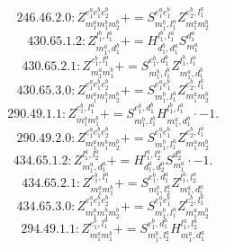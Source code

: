 \documentclass[letterpaper,10pt,fleqn,leqno,onecolumn]{article}
\begin{document}
\begin{equation} \;\;\;\;\;\;  246.46.2.0: Z^{e_{1}^{a}e_{1}^{b}e_{2}^{b}}_{m_{1}^{a}m_{1}^{b}m_{2}^{b}}+=S^{e_{1}^{a}e_{1}^{b}}_{m_{1}^{b},l_{1}^{a}}Z^{e_{2}^{b},l_{1}^{a}}_{m_{1}^{a}m_{2}^{b}} \end{equation}
\begin{equation} \;\;\;\;\;\;  430.65.1.2: Z^{l_{1}^{b},l_{1}^{a}}_{m_{1}^{a},d_{1}^{b}}+=H^{l_{1}^{b},l_{1}^{a}}_{d_{1}^{b},d_{1}^{a}}S^{d_{1}^{a}}_{m_{1}^{a}} \end{equation}
\begin{equation} \;\;\;\;\;\;  430.65.2.1: Z^{e_{1}^{b},l_{1}^{a}}_{m_{1}^{a}m_{1}^{b}}+=S^{e_{1}^{b},d_{1}^{b}}_{m_{1}^{b},l_{1}^{b}}Z^{l_{1}^{b},l_{1}^{a}}_{m_{1}^{a},d_{1}^{b}} \end{equation}
\begin{equation} \;\;\;\;\;\;  430.65.3.0: Z^{e_{1}^{a}e_{1}^{b}e_{2}^{b}}_{m_{1}^{a}m_{1}^{b}m_{2}^{b}}+=S^{e_{1}^{a}e_{1}^{b}}_{m_{1}^{b},l_{1}^{a}}Z^{e_{2}^{b},l_{1}^{a}}_{m_{1}^{a}m_{2}^{b}} \end{equation}
\begin{equation} \;\;\;\;\;\;  290.49.1.1: Z^{e_{1}^{b},l_{1}^{a}}_{m_{1}^{a}m_{1}^{b}}+=S^{e_{1}^{b},d_{1}^{b}}_{m_{1}^{b},l_{1}^{b}}H^{l_{1}^{b},l_{1}^{a}}_{m_{1}^{a},d_{1}^{b}}\cdot -1. \end{equation}
\begin{equation} \;\;\;\;\;\;  290.49.2.0: Z^{e_{1}^{a}e_{1}^{b}e_{2}^{b}}_{m_{1}^{a}m_{1}^{b}m_{2}^{b}}+=S^{e_{1}^{a}e_{1}^{b}}_{m_{1}^{b},l_{1}^{a}}Z^{e_{2}^{b},l_{1}^{a}}_{m_{1}^{a}m_{2}^{b}} \end{equation}
\begin{equation} \;\;\;\;\;\;  434.65.1.2: Z^{l_{1}^{a},l_{2}^{a}}_{m_{1}^{a},d_{1}^{a}}+=H^{l_{1}^{a},l_{2}^{a}}_{d_{1}^{a},d_{2}^{a}}S^{d_{2}^{a}}_{m_{1}^{a}}\cdot -1. \end{equation}
\begin{equation} \;\;\;\;\;\;  434.65.2.1: Z^{e_{1}^{b},l_{1}^{a}}_{m_{1}^{a}m_{1}^{b}}+=S^{e_{1}^{b},d_{1}^{a}}_{m_{1}^{b},l_{2}^{a}}Z^{l_{1}^{a},l_{2}^{a}}_{m_{1}^{a},d_{1}^{a}} \end{equation}
\begin{equation} \;\;\;\;\;\;  434.65.3.0: Z^{e_{1}^{a}e_{1}^{b}e_{2}^{b}}_{m_{1}^{a}m_{1}^{b}m_{2}^{b}}+=S^{e_{1}^{a}e_{1}^{b}}_{m_{1}^{b},l_{1}^{a}}Z^{e_{2}^{b},l_{1}^{a}}_{m_{1}^{a}m_{2}^{b}} \end{equation}
\begin{equation} \;\;\;\;\;\;  294.49.1.1: Z^{e_{1}^{b},l_{1}^{a}}_{m_{1}^{a}m_{1}^{b}}+=S^{e_{1}^{b},d_{1}^{a}}_{m_{1}^{b},l_{2}^{a}}H^{l_{1}^{a},l_{2}^{a}}_{m_{1}^{a},d_{1}^{a}} \end{equation}
\end{document}
